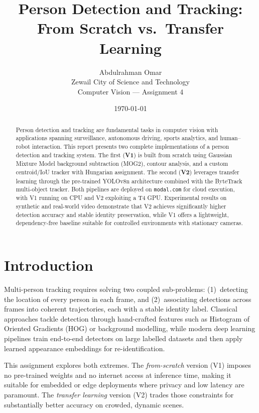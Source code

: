 \documentclass[12pt,a4paper]{article}
\title{\textbf{Person Detection and Tracking:\\
       From Scratch vs.\ Transfer Learning}}
\author{Abdulrahman Omar\\
        Zewail City of Science and Technology\\
        Computer Vision --- Assignment 4}
\date{\today}
\begin{document}
\maketitle
\tableofcontents
\newpage

\begin{abstract}
Person detection and tracking are fundamental tasks in computer vision with
applications spanning surveillance, autonomous driving, sports analytics, and
human--robot interaction. This report presents two complete implementations of
a person detection and tracking system. The first (\textbf{V1}) is built from
scratch using Gaussian Mixture Model background subtraction (MOG2), contour
analysis, and a custom centroid/IoU tracker with Hungarian assignment. The
second (\textbf{V2}) leverages transfer learning through the pre-trained
YOLOv8n \cite{yolov8} architecture combined with the ByteTrack
\cite{bytetrack} multi-object tracker. Both pipelines are deployed on
\texttt{modal.com} for cloud execution, with V1 running on CPU and V2 exploiting
a T4 GPU. Experimental results on synthetic and real-world video demonstrate
that V2 achieves significantly higher detection accuracy and stable identity
preservation, while V1 offers a lightweight, dependency-free baseline suitable
for controlled environments with stationary cameras.
\end{abstract}

\section{Introduction}

Multi-person tracking requires solving two coupled sub-problems: (1)~detecting
the location of every person in each frame, and (2)~associating detections
across frames into coherent trajectories, each with a stable identity label.
Classical approaches tackle detection through hand-crafted features such as
Histogram of Oriented Gradients (HOG) or background modelling, while modern
deep learning pipelines train end-to-end detectors on large labelled datasets
and then apply learned appearance embeddings for re-identification.

This assignment explores both extremes. The \emph{from-scratch} version (V1)
imposes no pre-trained weights and no internet access at inference time, making
it suitable for embedded or edge deployments where privacy and low latency are
paramount. The \emph{transfer learning} version (V2) trades those constraints
for substantially better accuracy on crowded, dynamic scenes.
\end{document}

